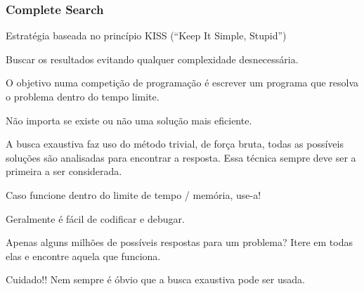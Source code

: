 \begin{frame}
\frametitle{Complete Search}
\begin{block}{}
\begin{itemize}
	\bitem Estratégia baseada no princípio KISS (``Keep It Simple, Stupid'')
	\begin{itemize}
		\bitem Buscar os resultados evitando qualquer complexidade desnecessária.
	\end{itemize}
	\bitem O objetivo numa competição de programação é escrever um programa que resolva o problema dentro do tempo limite.
	\begin{itemize}
		\bitem Não importa se existe ou não uma solução mais eficiente.
	\end{itemize}
	\bitem A busca exaustiva faz uso do método trivial, de força bruta, todas as possíveis soluções são analisadas para encontrar a resposta.
	\bitem Essa técnica sempre deve ser a primeira a ser considerada.
	\begin{itemize}
		\bitem Caso funcione dentro do limite de tempo / memória, use-a! 
		\begin{itemize}
			\bitem Geralmente é fácil de codificar e debugar.
		\end{itemize}
	\end{itemize}
	\bitem Apenas alguns milhões de possíveis respostas para um problema? Itere em todas elas e encontre aquela que funciona.
\end{itemize}
\end{block}
\pause

\begin{block}{\tiny Cuidado!!}
Nem sempre é óbvio que a busca exaustiva pode ser usada.
\end{block}
\end{frame}

